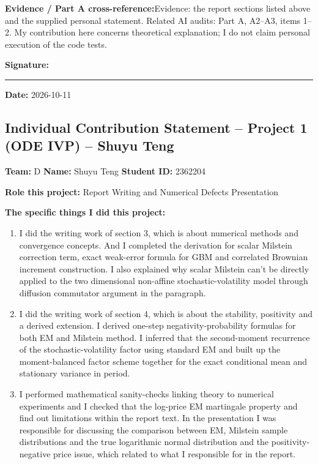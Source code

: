 \textbf{Evidence / Part A cross-reference:}\newline Evidence: the report sections listed above and the supplied personal statement. Related AI audits: Part A, A2--A3, items 1--2. My contribution here concerns theoretical explanation; I do not claim personal execution of the code tests.

\vspace{8mm}\textbf{Signature:} \rule{5cm}{.3pt} \qquad \textbf{Date:} 2026-10-11
\clearpage
\subsection*{Individual Contribution Statement -- Project 1 (ODE IVP) -- Shuyu Teng}
\textbf{Team:} D \quad \textbf{Name:} Shuyu Teng \quad \textbf{Student ID:} 2362204

\textbf{Role this project:} Report Writing and Numerical Defects Presentation

\textbf{The specific things I did this project:}
\begin{enumerate}[leftmargin=*]
\item I did the writing work of section 3, which is about numerical methods and convergence concepts. And I completed the derivation for scalar Milstein correction term, exact weak-error formula for GBM and correlated Brownian increment construction. I also explained why scalar Milstein can't be directly applied to the two dimensional non-affine stochastic-volatility model through diffusion commutator argument in the paragraph.
\item I did the writing work of section 4, which is about the stability, positivity and a derived extension. I derived one-step negativity-probability formulas for both EM and Milstein method. I inferred that the second-moment recurrence of the stochastic-volatility factor using standard EM and built up the moment-balanced factor scheme together for the exact conditional mean and stationary variance in period.
\item I performed mathematical sanity-checks linking theory to numerical experiments and I checked that the log-price EM martingale property and find out limitations within the report text. In the presentation I was responsible for discussing the comparison between EM, Milstein sample distributions and the true logarithmic normal distribution and the positivity-negative price issue, which related to what I responsible for in the report.
\end{enumerate}

